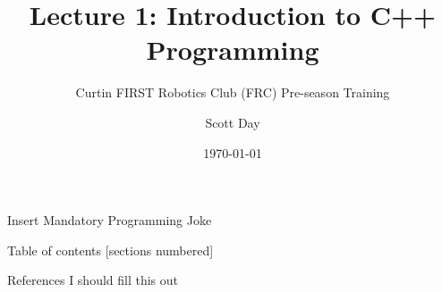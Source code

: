 \documentclass[9pt]{beamer}              %
\title{Lecture 1: Introduction to C++ Programming}
\subtitle{Curtin FIRST Robotics Club (FRC) Pre-season Training}
\date{\today}
\author{Scott Day}
\institute{Curtin University}
\begin{document}


\maketitle

\begin{frame}[fragile]{Insert Mandatory Programming Joke}
    \begin{center}
    \end{center}
\end{frame}

\begin{frame}{Table of contents}
  [sections numbered]
  \tableofcontents[hideallsubsections]
\end{frame}








\begin{frame}[allowframebreaks]{References}
    I should fill this out
    
    
\end{frame}


\end{document}
